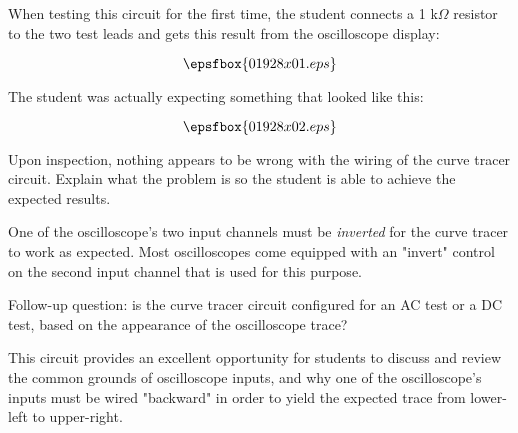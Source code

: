 

When testing this circuit for the first time, the student connects a 1 k$\Omega$ resistor to the two test leads and gets this result from the oscilloscope display:

$$\epsfbox{01928x01.eps}$$

The student was actually expecting something that looked like this:

$$\epsfbox{01928x02.eps}$$

Upon inspection, nothing appears to be wrong with the wiring of the curve tracer circuit.  Explain what the problem is so the student is able to achieve the expected results.







One of the oscilloscope's two input channels must be {\it inverted} for the curve tracer to work as expected.  Most oscilloscopes come equipped with an "invert" control on the second input channel that is used for this purpose.

\vskip 10pt

Follow-up question: is the curve tracer circuit configured for an AC test or a DC test, based on the appearance of the oscilloscope trace?







This circuit provides an excellent opportunity for students to discuss and review the common grounds of oscilloscope inputs, and why one of the oscilloscope's inputs must be wired "backward" in order to yield the expected trace from lower-left to upper-right.



